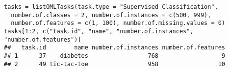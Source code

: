 
\begin{knitrout}\small
{}\color{fgcolor}\begin{kframe}
\begin{verbatim}
tasks = listOMLTasks(task.type = "Supervised Classification",
  number.of.classes = 2, number.of.instances = c(500, 999),
  number.of.features = c(1, 100), number.of.missing.values = 0)
tasks[1:2, c("task.id", "name", "number.of.instances", "number.of.features")]
##   task.id        name number.of.instances number.of.features
## 1      37    diabetes                 768                  9
## 2      49 tic-tac-toe                 958                 10
\end{verbatim}
\end{kframe}
\end{knitrout}

